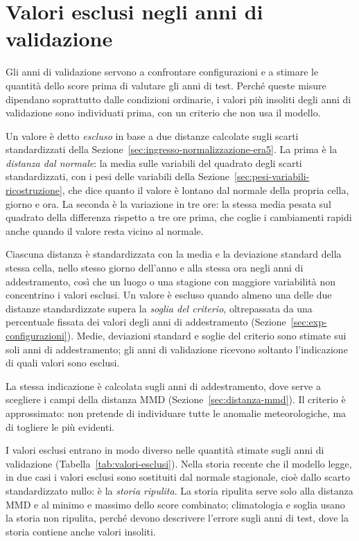 \section{Valori esclusi negli anni di validazione}
\label{sec:maschere-validazione}

Gli anni di validazione servono a confrontare configurazioni e a stimare le quantità dello score prima di valutare gli anni di test. Perché queste misure dipendano soprattutto dalle condizioni ordinarie, i valori più insoliti degli anni di validazione sono individuati prima, con un criterio che non usa il modello.

Un valore è detto \emph{escluso} in base a due distanze calcolate sugli scarti standardizzati della Sezione~\ref{sec:ingresso-normalizzazione-era5}. La prima è la \emph{distanza dal normale}: la media sulle variabili del quadrato degli scarti standardizzati, con i pesi delle variabili della Sezione~\ref{sec:pesi-variabili-ricostruzione}, che dice quanto il valore è lontano dal normale della propria cella, giorno e ora. La seconda è la variazione in tre ore: la stessa media pesata sul quadrato della differenza rispetto a tre ore prima, che coglie i cambiamenti rapidi anche quando il valore resta vicino al normale.

Ciascuna distanza è standardizzata con la media e la deviazione standard della stessa cella, nello stesso giorno dell'anno e alla stessa ora negli anni di addestramento, così che un luogo o una stagione con maggiore variabilità non concentrino i valori esclusi. Un valore è escluso quando almeno una delle due distanze standardizzate supera la \emph{soglia del criterio}, oltrepassata da una percentuale fissata dei valori degli anni di addestramento (Sezione~\ref{sec:exp-configurazioni}). Medie, deviazioni standard e soglie del criterio sono stimate sui soli anni di addestramento; gli anni di validazione ricevono soltanto l'indicazione di quali valori sono esclusi.

La stessa indicazione è calcolata sugli anni di addestramento, dove serve a scegliere i campi della distanza MMD (Sezione~\ref{sec:distanza-mmd}). Il criterio è approssimato: non pretende di individuare tutte le anomalie meteorologiche, ma di togliere le più evidenti.

I valori esclusi entrano in modo diverso nelle quantità stimate sugli anni di validazione (Tabella~\ref{tab:valori-esclusi}). Nella storia recente che il modello legge, in due casi i valori esclusi sono sostituiti dal normale stagionale, cioè dallo scarto standardizzato nullo: è la \emph{storia ripulita}. La storia ripulita serve solo alla distanza MMD e al minimo e massimo dello score combinato; climatologia e soglia usano la storia non ripulita, perché devono descrivere l'errore sugli anni di test, dove la storia contiene anche valori insoliti.

